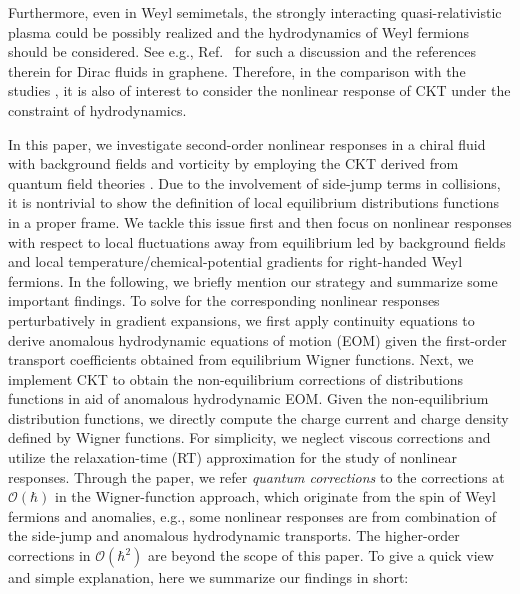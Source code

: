 \documentclass[aps,prd,showkeys,preprint,amsmath,amssymb,nofootinbib]{revtex4-1}
\begin{document}
Furthermore, even in Weyl semimetals, the strongly interacting quasi-relativistic plasma could be possibly realized and the hydrodynamics of Weyl fermions should be considered. See e.g., Ref.~\cite{Lucas:2016omy} for such a discussion and the references therein for Dirac fluids in graphene. Therefore, in the comparison with the studies \cite{Gorbar:2016qfh,Chen:2016xtg}, it is also of interest to consider the nonlinear response of CKT under the constraint of hydrodynamics.

In this paper, we investigate second-order nonlinear responses in a chiral fluid with background fields and vorticity by employing the CKT derived from quantum field theories \cite{Hidaka:2016yjf}. Due to the involvement of side-jump terms in collisions, it is nontrivial to show the definition of local equilibrium distributions functions in a proper frame. We tackle this issue first and then focus on nonlinear responses with respect to local fluctuations away from equilibrium led by background fields and local temperature/chemical-potential gradients for right-handed Weyl fermions. In the following, we briefly mention our strategy and summarize some important findings. To solve for the corresponding nonlinear responses perturbatively in gradient expansions, we first apply continuity equations to derive anomalous hydrodynamic equations of motion (EOM) given the first-order transport coefficients obtained from equilibrium Wigner functions. Next, we implement CKT to obtain the non-equilibrium corrections of distributions functions in aid of anomalous hydrodynamic EOM. Given the non-equilibrium distribution functions, we directly compute the charge current and charge density defined by Wigner functions. For simplicity, we neglect viscous corrections and utilize the relaxation-time (RT) approximation for the study of nonlinear responses. Through the paper, we refer \emph{quantum corrections} to the corrections at $\mathcal{O}(\hbar)$ in the Wigner-function approach, which originate from the spin of Weyl fermions and anomalies, 
e.g., some nonlinear responses are from combination of the side-jump and anomalous hydrodynamic
transports. The higher-order corrections in $\mathcal{O}(\hbar^2)$ are beyond the scope of this paper. To give a quick view and simple explanation, here we summarize our findings in short:     
\end{document}
